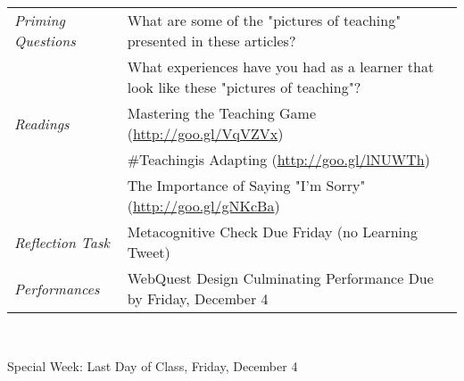 \documentclass{tufte-handout}
\newcommand{\tabpq}{\faQuestionCircle\medspace\textit{Priming Questions}}
\newcommand{\tabread}{\faBook\medspace\textit{Readings}}
\newcommand{\tabperformance}{\faTasks\medspace\textit{Performances}}
\newcommand{\tabcheck}{\faLightbulbO\medspace\textit{Reflection Task} & Metacognitive Check Due Friday (no Learning Tweet) \\}
\newenvironment{tabsched}
	{\small
	\begin{tabular}{p{1.5in}p{4.5in}}
	\toprule}
	{\bottomrule
	\end{tabular}
	\normalsize\\}
\newenvironment{specweek}
	{\begin{center}
		\fontseries{b} \faBullhorn \medspace Special Week: }
		{\medspace \faBullhorn \fontseries{m}
	\end{center}}
\newcommand{\finisemester}{Last Day of Class, Friday, December 4}
\begin{document}
\begin{fullwidth}
\begin{tabsched}
	\tabpq & What are some of the "pictures of teaching" presented in these articles? \\
	& What experiences have you had as a learner that look like these "pictures of teaching"? \\
	\midrule
	\tabread & Mastering the Teaching Game (\url{http://goo.gl/VqVZVx}) \\
	& \#Teachingis Adapting (\url{http://goo.gl/lNUWTh}) \\
	& The Importance of Saying "I'm Sorry" (\url{http://goo.gl/gNKcBa}) \\
	\midrule
	\tabcheck
	\midrule
	\tabperformance & WebQuest Design Culminating Performance Due by Friday, December 4 \\
\end{tabsched}

\begin{specweek}\finisemester\end{specweek}

\end{fullwidth}
\end{document}
